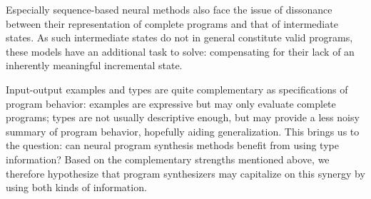 \documentclass{article} %
\begin{document}

Especially sequence-based neural methods also face the issue
of dissonance between their representation of complete programs and that of intermediate states.
As such intermediate states do not in general constitute valid programs,
these models have an additional task to solve:
compensating for their lack of an inherently meaningful incremental state.



Input-output examples and types are quite complementary as specifications of program behavior:
examples are expressive but may only evaluate complete programs;
types are not usually descriptive enough,
but may provide a less noisy summary of program behavior, hopefully aiding generalization.
%
This brings us to the question:
can neural program synthesis methods benefit from using type information?
%
%
Based on the complementary strengths mentioned above,
we therefore hypothesize that program synthesizers may capitalize on this synergy by using both kinds of information.
%

\end{document}
